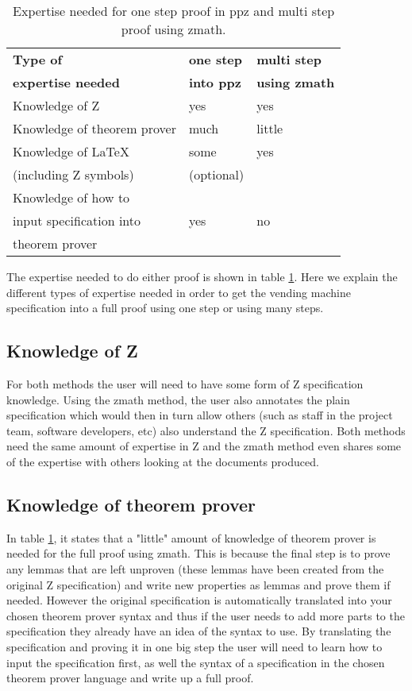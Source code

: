 \begin{table}[H]
\begin{center}
\begin{tabular}{| l | l | l |}
\hline
\textbf{Type of} & \textbf{one step} & \textbf{multi step} \\
\textbf{expertise needed} & \textbf{into \gls{ppz}} & \textbf{using \gls{zmath}}
\\
\hline
\hline
Knowledge of Z &  yes & yes \\
\hline
Knowledge of theorem prover & much & little \\
\hline
Knowledge of \LaTeX & some & yes \\
(including Z symbols) & (optional) & \\
\hline
Knowledge of how to & & \\
input specification into & yes & no \\
theorem prover & & \\
\hline
\end{tabular}
\end{center}
\caption{Expertise needed for one step proof in \gls{ppz} and multi step proof using \gls{zmath}.}
\label{tab:expertise}
\end{table}

The expertise needed to do either proof is shown in table \ref{tab:expertise}.
Here we explain the different types of expertise needed in order to get the
vending machine specification into a full proof using one step or using many
steps.

\subsection{Knowledge of Z}
For both methods the user will need to have some form of Z specification
knowledge. Using the \gls{zmath} method, the user also annotates the plain
specification which would then in turn allow others (such as staff in the
project team, software developers, etc) also understand the Z specification.
Both methods need the same amount of expertise in Z and the \gls{zmath} method
even shares some of the expertise with others looking at the documents produced.

\subsection{Knowledge of theorem prover}
In table \ref{tab:expertise}, it states that a "little" amount of knowledge of
theorem prover is needed for the full proof using \gls{zmath}. This is because
the final step is to prove any lemmas that are left unproven (these lemmas have
been created from the original Z specification) and write new properties as
lemmas and prove them if needed. However the original specification is
automatically translated into your chosen theorem prover syntax and thus if the
user needs to add more parts to the specification they already have an idea of
the syntax to use. By translating the specification and proving it in one big
step the user will need to learn how to input the specification first, as well
the syntax of a specification in the chosen theorem prover language and write up
a full proof. 

